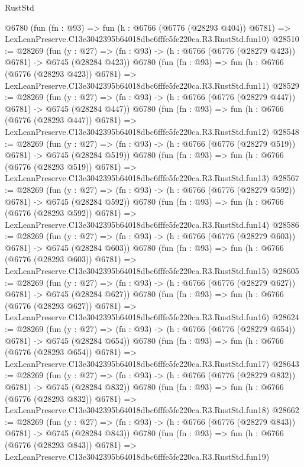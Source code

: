 \begin{lexlean}{RustStd}
\begin{coremodule}
    @6780
    (fun (fn : @93) =>
    fun (h : @6766 (@6776 (@28293 @404)) @6781) =>
    LexLeanPreserve.C13e3042395b64018dbc6fffe5fe220ca.R3.RustStd.fun10)
@28510 := @28269
    (fun (y : @27) => (fn : @93) -> (h : @6766 (@6776 (@28279 @423)) @6781) -> @6745 (@28284 @423))
    @6780
    (fun (fn : @93) =>
    fun (h : @6766 (@6776 (@28293 @423)) @6781) =>
    LexLeanPreserve.C13e3042395b64018dbc6fffe5fe220ca.R3.RustStd.fun11)
@28529 := @28269
    (fun (y : @27) => (fn : @93) -> (h : @6766 (@6776 (@28279 @447)) @6781) -> @6745 (@28284 @447))
    @6780
    (fun (fn : @93) =>
    fun (h : @6766 (@6776 (@28293 @447)) @6781) =>
    LexLeanPreserve.C13e3042395b64018dbc6fffe5fe220ca.R3.RustStd.fun12)
@28548 := @28269
    (fun (y : @27) => (fn : @93) -> (h : @6766 (@6776 (@28279 @519)) @6781) -> @6745 (@28284 @519))
    @6780
    (fun (fn : @93) =>
    fun (h : @6766 (@6776 (@28293 @519)) @6781) =>
    LexLeanPreserve.C13e3042395b64018dbc6fffe5fe220ca.R3.RustStd.fun13)
@28567 := @28269
    (fun (y : @27) => (fn : @93) -> (h : @6766 (@6776 (@28279 @592)) @6781) -> @6745 (@28284 @592))
    @6780
    (fun (fn : @93) =>
    fun (h : @6766 (@6776 (@28293 @592)) @6781) =>
    LexLeanPreserve.C13e3042395b64018dbc6fffe5fe220ca.R3.RustStd.fun14)
@28586 := @28269
    (fun (y : @27) => (fn : @93) -> (h : @6766 (@6776 (@28279 @603)) @6781) -> @6745 (@28284 @603))
    @6780
    (fun (fn : @93) =>
    fun (h : @6766 (@6776 (@28293 @603)) @6781) =>
    LexLeanPreserve.C13e3042395b64018dbc6fffe5fe220ca.R3.RustStd.fun15)
@28605 := @28269
    (fun (y : @27) => (fn : @93) -> (h : @6766 (@6776 (@28279 @627)) @6781) -> @6745 (@28284 @627))
    @6780
    (fun (fn : @93) =>
    fun (h : @6766 (@6776 (@28293 @627)) @6781) =>
    LexLeanPreserve.C13e3042395b64018dbc6fffe5fe220ca.R3.RustStd.fun16)
@28624 := @28269
    (fun (y : @27) => (fn : @93) -> (h : @6766 (@6776 (@28279 @654)) @6781) -> @6745 (@28284 @654))
    @6780
    (fun (fn : @93) =>
    fun (h : @6766 (@6776 (@28293 @654)) @6781) =>
    LexLeanPreserve.C13e3042395b64018dbc6fffe5fe220ca.R3.RustStd.fun17)
@28643 := @28269
    (fun (y : @27) => (fn : @93) -> (h : @6766 (@6776 (@28279 @832)) @6781) -> @6745 (@28284 @832))
    @6780
    (fun (fn : @93) =>
    fun (h : @6766 (@6776 (@28293 @832)) @6781) =>
    LexLeanPreserve.C13e3042395b64018dbc6fffe5fe220ca.R3.RustStd.fun18)
@28662 := @28269
    (fun (y : @27) => (fn : @93) -> (h : @6766 (@6776 (@28279 @843)) @6781) -> @6745 (@28284 @843))
    @6780
    (fun (fn : @93) =>
    fun (h : @6766 (@6776 (@28293 @843)) @6781) =>
    LexLeanPreserve.C13e3042395b64018dbc6fffe5fe220ca.R3.RustStd.fun19)

\end{coremodule}
\end{lexlean}
